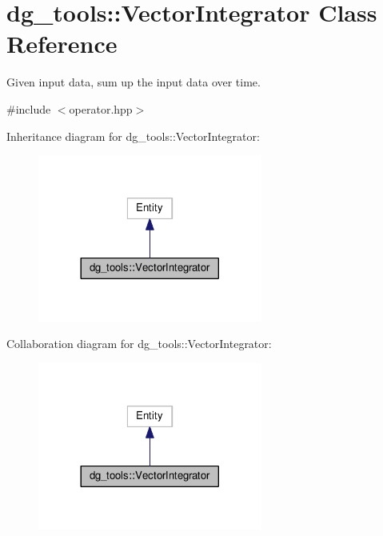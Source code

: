 \hypertarget{classdg__tools_1_1VectorIntegrator}{}\section{dg\+\_\+tools\+:\+:Vector\+Integrator Class Reference}
\label{classdg__tools_1_1VectorIntegrator}


Given input data, sum up the input data over time.  




{\ttfamily \#include $<$operator.\+hpp$>$}



Inheritance diagram for dg\+\_\+tools\+:\+:Vector\+Integrator\+:
\nopagebreak
\begin{figure}[H]
\begin{center}
\leavevmode
\includegraphics[width=209pt]{classdg__tools_1_1VectorIntegrator__inherit__graph}
\end{center}
\end{figure}


Collaboration diagram for dg\+\_\+tools\+:\+:Vector\+Integrator\+:
\nopagebreak
\begin{figure}[H]
\begin{center}
\leavevmode
\includegraphics[width=209pt]{classdg__tools_1_1VectorIntegrator__coll__graph}
\end{center}
\end{figure}
